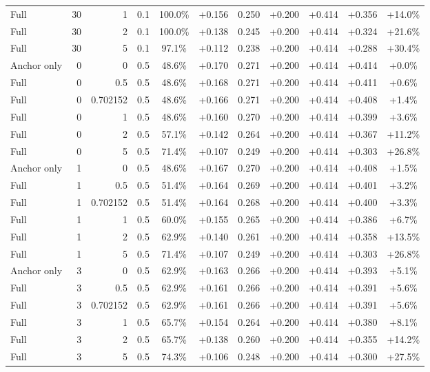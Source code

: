 \begin{table}[htbp]
\begin{tabular}{lrrrccccccc}
Full & 30 & 1 & 0.1 & 100.0\% & +0.156 & 0.250 & +0.200 & +0.414 & +0.356 & +14.0\% \\
Full & 30 & 2 & 0.1 & 100.0\% & +0.138 & 0.245 & +0.200 & +0.414 & +0.324 & +21.6\% \\
Full & 30 & 5 & 0.1 & 97.1\% & +0.112 & 0.238 & +0.200 & +0.414 & +0.288 & +30.4\% \\
Anchor only & 0 & 0 & 0.5 & 48.6\% & +0.170 & 0.271 & +0.200 & +0.414 & +0.414 & +0.0\% \\
Full & 0 & 0.5 & 0.5 & 48.6\% & +0.168 & 0.271 & +0.200 & +0.414 & +0.411 & +0.6\% \\
Full & 0 & 0.702152 & 0.5 & 48.6\% & +0.166 & 0.271 & +0.200 & +0.414 & +0.408 & +1.4\% \\
Full & 0 & 1 & 0.5 & 48.6\% & +0.160 & 0.270 & +0.200 & +0.414 & +0.399 & +3.6\% \\
Full & 0 & 2 & 0.5 & 57.1\% & +0.142 & 0.264 & +0.200 & +0.414 & +0.367 & +11.2\% \\
Full & 0 & 5 & 0.5 & 71.4\% & +0.107 & 0.249 & +0.200 & +0.414 & +0.303 & +26.8\% \\
Anchor only & 1 & 0 & 0.5 & 48.6\% & +0.167 & 0.270 & +0.200 & +0.414 & +0.408 & +1.5\% \\
Full & 1 & 0.5 & 0.5 & 51.4\% & +0.164 & 0.269 & +0.200 & +0.414 & +0.401 & +3.2\% \\
Full & 1 & 0.702152 & 0.5 & 51.4\% & +0.164 & 0.268 & +0.200 & +0.414 & +0.400 & +3.3\% \\
Full & 1 & 1 & 0.5 & 60.0\% & +0.155 & 0.265 & +0.200 & +0.414 & +0.386 & +6.7\% \\
Full & 1 & 2 & 0.5 & 62.9\% & +0.140 & 0.261 & +0.200 & +0.414 & +0.358 & +13.5\% \\
Full & 1 & 5 & 0.5 & 71.4\% & +0.107 & 0.249 & +0.200 & +0.414 & +0.303 & +26.8\% \\
Anchor only & 3 & 0 & 0.5 & 62.9\% & +0.163 & 0.266 & +0.200 & +0.414 & +0.393 & +5.1\% \\
Full & 3 & 0.5 & 0.5 & 62.9\% & +0.161 & 0.266 & +0.200 & +0.414 & +0.391 & +5.6\% \\
Full & 3 & 0.702152 & 0.5 & 62.9\% & +0.161 & 0.266 & +0.200 & +0.414 & +0.391 & +5.6\% \\
Full & 3 & 1 & 0.5 & 65.7\% & +0.154 & 0.264 & +0.200 & +0.414 & +0.380 & +8.1\% \\
Full & 3 & 2 & 0.5 & 65.7\% & +0.138 & 0.260 & +0.200 & +0.414 & +0.355 & +14.2\% \\
Full & 3 & 5 & 0.5 & 74.3\% & +0.106 & 0.248 & +0.200 & +0.414 & +0.300 & +27.5\% \\

\end{tabular}
\end{table}
